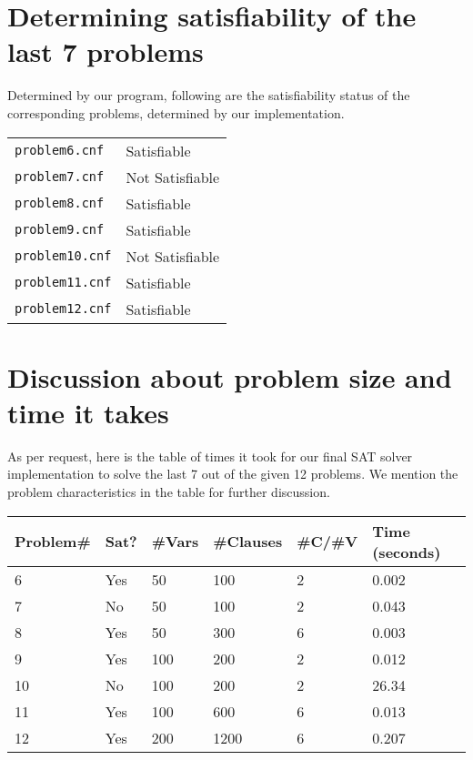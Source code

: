 \documentclass{article}
\begin{document}
\section{Determining satisfiability of the last 7 problems}

Determined by our program, following are the
satisfiability status of the corresponding problems,
determined by our implementation.

\begin{center}
    \begin{tabular}{l l}
        \texttt{problem6.cnf}  & Satisfiable \\
        \texttt{problem7.cnf}  & Not Satisfiable \\
        \texttt{problem8.cnf}  & Satisfiable \\
        \texttt{problem9.cnf}  & Satisfiable \\
        \texttt{problem10.cnf} & Not Satisfiable \\
        \texttt{problem11.cnf} & Satisfiable \\
        \texttt{problem12.cnf} & Satisfiable
    \end{tabular}
\end{center}

\section{Discussion about problem size and time it takes}

As per request, here is the table of times it took for our final
SAT solver implementation to solve the last 7 out of the given 12
problems. We mention the problem characteristics in the table for
further discussion.

\begin{center}
    \begin{tabular}{l || l | l | l | l || l}
    Problem\#  & Sat? & \#Vars & \#Clauses & \#C/\#V & Time (seconds) \\\hline
    6          & Yes  & 50     & 100       & 2       & 0.002 \\
    7          & No   & 50     & 100       & 2       & 0.043 \\
    8          & Yes  & 50     & 300       & 6       & 0.003 \\
    9          & Yes  & 100    & 200       & 2       & 0.012 \\
    10         & No   & 100    & 200       & 2       & 26.34 \\
    11         & Yes  & 100    & 600       & 6       & 0.013 \\
    12         & Yes  & 200    & 1200      & 6       & 0.207
    \end{tabular}
\end{center}
\end{document}
